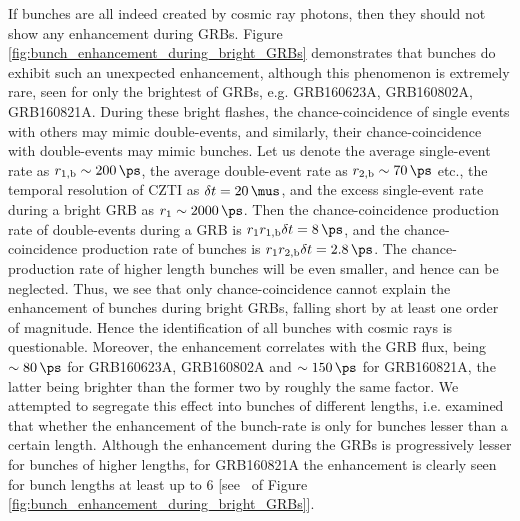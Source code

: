 If bunches are all indeed created by cosmic ray photons, then they should not show any enhancement during GRBs. Figure \ref{fig:bunch_enhancement_during_bright_GRBs} demonstrates that bunches do exhibit such an unexpected enhancement, although this phenomenon is extremely rare, seen for only the brightest of GRBs, e.g. GRB160623A, GRB160802A, GRB160821A. During these bright flashes, the chance-coincidence of single events with others may mimic double-events, and similarly, their chance-coincidence with double-events may mimic bunches. Let us denote the average single-event rate as $r_{\rm{1,b}} \sim 200 \, \ps$, the average double-event rate as $r_{\rm{2,b}} \sim 70 \, \ps$ etc., the temporal resolution of CZTI as $\delta t =  20 \, \mus$, and the excess single-event rate during a bright GRB as $r_1 \sim 2000 \, \ps$. Then the chance-coincidence production rate of double-events during a GRB is $r_{\rm{1}} r_{\rm{1,b}} \delta t = 8 \, \ps$, and the chance-coincidence production rate of bunches is $r_{\rm{1}} r_{\rm{2,b}} \delta t = 2.8 \, \ps$. The chance-production rate of higher length bunches will be even smaller, and hence can be neglected. Thus, we see that only chance-coincidence cannot explain the enhancement of bunches during bright GRBs, falling short by at least one order of magnitude. Hence the identification of all bunches with cosmic rays is questionable. Moreover, the enhancement correlates with the GRB flux, being $\sim 80 \, \ps$ for GRB160623A, GRB160802A and $\sim 150 \, \ps$ for GRB160821A, the latter being brighter than the former two by roughly the same factor. We attempted to segregate this effect into bunches of different lengths, i.e. examined that whether the enhancement of the bunch-rate is only for bunches lesser than a certain length. Although the enhancement during the GRBs is progressively lesser for bunches of higher lengths, for GRB160821A the enhancement is clearly seen for bunch lengths at least up to $6$ [see \eR\ of Figure \ref{fig:bunch_enhancement_during_bright_GRBs}].

